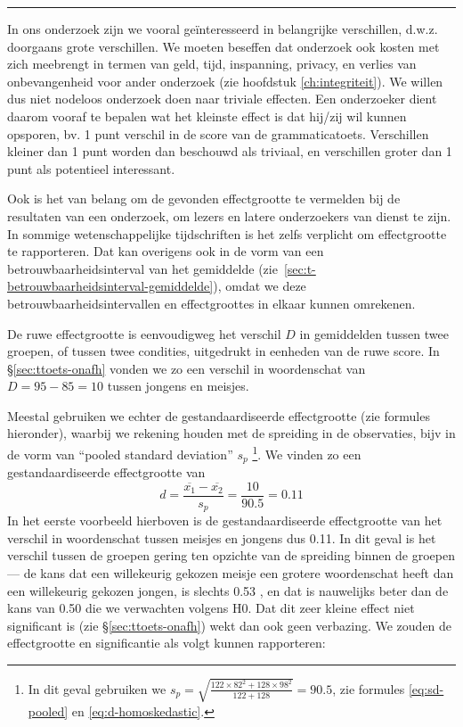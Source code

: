 \documentclass[
]{book}
\begin{document}
\begin{center}\rule{0.5\linewidth}{0.5pt}\end{center}

In ons onderzoek zijn we vooral geïnteresseerd in belangrijke
verschillen, d.w.z. doorgaans grote verschillen. We moeten beseffen dat
onderzoek ook kosten met zich meebrengt in termen van geld, tijd,
inspanning, privacy, en verlies van onbevangenheid voor ander onderzoek
(zie hoofdstuk
\ref{ch:integriteit}). We willen dus niet nodeloos onderzoek doen
naar triviale effecten. Een onderzoeker dient daarom vooraf te bepalen
wat het kleinste effect is dat hij/zij wil kunnen opsporen, bv. 1 punt
verschil in de score van de grammaticatoets. Verschillen kleiner dan 1
punt worden dan beschouwd als triviaal, en verschillen groter dan 1 punt
als potentieel interessant.

Ook is het van belang om de gevonden effectgrootte te vermelden bij de
resultaten van een onderzoek, om lezers en latere onderzoekers van
dienst te zijn. In sommige wetenschappelijke tijdschriften is het zelfs
verplicht om effectgrootte te rapporteren. Dat kan overigens ook in de
vorm van een betrouwbaarheidsinterval van het gemiddelde
(zie~\ref{sec:t-betrouwbaarheidsinterval-gemiddelde}), omdat we deze
betrouwbaarheidsintervallen en effectgroottes in elkaar kunnen
omrekenen.

De ruwe effectgrootte is eenvoudigweg het verschil \(D\) in gemiddelden
tussen twee groepen, of tussen twee condities, uitgedrukt in eenheden
van de ruwe score. In §\ref{sec:ttoets-onafh} vonden we zo een verschil in woordenschat
van \(D=95-85=10\) tussen jongens en meisjes.

Meestal gebruiken we echter de gestandaardiseerde effectgrootte (zie
formules hieronder), waarbij we rekening houden met de spreiding in de
observaties, bijv in de vorm van ``pooled standard deviation'' \(s_p\) \footnote{In dit geval gebruiken we \(s_p = \sqrt{ \frac{122\times82^2+128\times98^2} {122+128} } = 90.5\), zie formules \eqref{eq:sd-pooled} en \eqref{eq:d-homoskedastic}.}.
We vinden zo een gestandaardiseerde effectgrootte van
\begin{equation}
  \label{eq:d-standardized}
    d = \frac{ \overline{x_1}-\overline{x_2} } {s_p} = \frac{10}{90.5} = 0.11
\end{equation}
In het eerste voorbeeld hierboven is de gestandaardiseerde effectgrootte
van het verschil in woordenschat tussen meisjes en jongens dus 0.11. In
dit geval is het verschil tussen de groepen gering ten opzichte van de
spreiding binnen de groepen --- de kans dat een willekeurig gekozen
meisje een grotere woordenschat heeft dan een willekeurig gekozen
jongen, is slechts 0.53 \citep{McGraw92}, en dat is nauwelijks beter dan de
kans van 0.50 die we verwachten volgens H0. Dat dit zeer kleine effect
niet significant is (zie §\ref{sec:ttoets-onafh}) wekt dan ook geen verbazing.
We zouden de
effectgrootte en significantie als volgt kunnen rapporteren:
\end{document}
